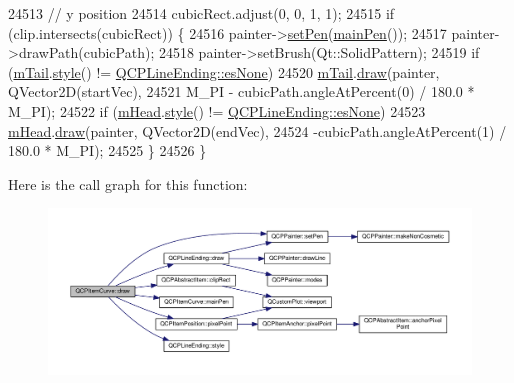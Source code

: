 \begin{DoxyCode}
24513                            \textcolor{comment}{// y position}
24514     cubicRect.adjust(0, 0, 1, 1);
24515   \textcolor{keywordflow}{if} (clip.intersects(cubicRect)) \{
24516     painter->\hyperlink{class_q_c_p_painter_af9c7a4cd1791403901f8c5b82a150195}{setPen}(\hyperlink{class_q_c_p_item_curve_a8089126f5645b6edfbaddea49d1e8390}{mainPen}());
24517     painter->drawPath(cubicPath);
24518     painter->setBrush(Qt::SolidPattern);
24519     \textcolor{keywordflow}{if} (\hyperlink{class_q_c_p_item_curve_af1dca285b97e3f5b892dab827a79f327}{mTail}.\hyperlink{class_q_c_p_line_ending_aea324dbfddbca9895ca8a3a968671299}{style}() != \hyperlink{class_q_c_p_line_ending_a5ef16e6876b4b74959c7261d8d4c2cd5aca12d500f50cd6871766801bac30fb03}{QCPLineEnding::esNone})
24520       \hyperlink{class_q_c_p_item_curve_af1dca285b97e3f5b892dab827a79f327}{mTail}.\hyperlink{class_q_c_p_line_ending_ac4b2fa94bd27b2f008b5fc090fcd7c0b}{draw}(painter, QVector2D(startVec),
24521                  M\_PI - cubicPath.angleAtPercent(0) / 180.0 * M\_PI);
24522     \textcolor{keywordflow}{if} (\hyperlink{class_q_c_p_item_curve_af2cc26ff199570940dc96f5ec19a13f8}{mHead}.\hyperlink{class_q_c_p_line_ending_aea324dbfddbca9895ca8a3a968671299}{style}() != \hyperlink{class_q_c_p_line_ending_a5ef16e6876b4b74959c7261d8d4c2cd5aca12d500f50cd6871766801bac30fb03}{QCPLineEnding::esNone})
24523       \hyperlink{class_q_c_p_item_curve_af2cc26ff199570940dc96f5ec19a13f8}{mHead}.\hyperlink{class_q_c_p_line_ending_ac4b2fa94bd27b2f008b5fc090fcd7c0b}{draw}(painter, QVector2D(endVec),
24524                  -cubicPath.angleAtPercent(1) / 180.0 * M\_PI);
24525   \}
24526 \}
\end{DoxyCode}


Here is the call graph for this function\+:\nopagebreak
\begin{figure}[H]
\begin{center}
\leavevmode
\includegraphics[width=350pt]{class_q_c_p_item_curve_a56cb5b72cd02db2eda598274a39839a9_cgraph}
\end{center}
\end{figure}


